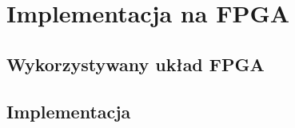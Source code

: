 \chapter{Implementacja na FPGA}
\label{cha:fpga}

\section{Wykorzystywany układ FPGA}
\label{sec:plytka}

\section{Implementacja}
\label{sec:implementacja}


